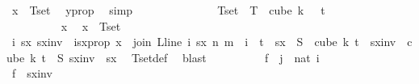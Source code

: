 \begin{isabellebody}
\ {\isachardoublequoteopen}x\ {\isasymin}\ Tset{\isachardoublequoteclose}\ \isamarkupfalse%
\ y{\isacharunderscore}{\kern0pt}prop\ \isamarkupfalse%
\ simp\isanewline
\ \ \ \ \ \ \isamarkupfalse%
\isanewline
\isanewline
\ \ \ \ \ \ \isamarkupfalse%
\ {\isachardoublequoteopen}Tset\ {\isasymsubseteq}\ T\ {\isacharbackquote}{\kern0pt}\ cube\ {\isacharparenleft}{\kern0pt}k\ {\isacharplus}{\kern0pt}\ {}{\isacharparenright}{\kern0pt}\ {\isacharparenleft}{\kern0pt}t\ {\isacharplus}{\kern0pt}\ {}{\isacharparenright}{\kern0pt}{\isachardoublequoteclose}\ \isanewline
\ \ \ \ \ \ \isamarkupfalse%
\isanewline
\ \ \ \ \ \ \ \ \isamarkupfalse%
\ x\ \isamarkupfalse%
\ {\isachardoublequoteopen}x\ {\isasymin}\ Tset{\isachardoublequoteclose}\isanewline
\ \ \ \ \ \ \ \ \isamarkupfalse%
\ \isamarkupfalse%
\ i\ sx\ sxinv\ \ isx{\isacharunderscore}{\kern0pt}prop{\isacharcolon}{\kern0pt}\ {\isachardoublequoteopen}x\ {\isacharequal}{\kern0pt}\ join\ {\isacharparenleft}{\kern0pt}L{\isacharunderscore}{\kern0pt}line\ i{\isacharparenright}{\kern0pt}\ sx\ n\ m\ {\isasymand}\ i\ {\isasymin}\ {\isacharbraceleft}{\kern0pt}{\isachardot}{\kern0pt}{\isachardot}{\kern0pt}{\isacharless}{\kern0pt}t{\isacharplus}{\kern0pt}{}{\isacharbraceright}{\kern0pt}\ {\isasymand}\ sx\ {\isasymin}\ S\ {\isacharbackquote}{\kern0pt}\ {\isacharparenleft}{\kern0pt}cube\ k\ {\isacharparenleft}{\kern0pt}t{\isacharplus}{\kern0pt}{}{\isacharparenright}{\kern0pt}{\isacharparenright}{\kern0pt}\ {\isasymand}\ sxinv\ {\isasymin}\ cube\ k\ {\isacharparenleft}{\kern0pt}t{\isacharplus}{\kern0pt}{}{\isacharparenright}{\kern0pt}\ {\isasymand}\ S\ sxinv\ {\isacharequal}{\kern0pt}\ sx{\isachardoublequoteclose}\ \isamarkupfalse%
\ Tset{\isacharunderscore}{\kern0pt}def\ \isamarkupfalse%
\ blast\isanewline
\ \ \ \ \ \ \ \ \isamarkupfalse%
\ {\isacharquery}{\kern0pt}f{}\ {\isacharequal}{\kern0pt}\ {\isachardoublequoteopen}{\isacharparenleft}{\kern0pt}{\isasymlambda}j\ {\isasymin}\ {\isacharbraceleft}{\kern0pt}{\isachardot}{\kern0pt}{\isachardot}{\kern0pt}{\isacharless}{\kern0pt}{}{\isacharcolon}{\kern0pt}{\isacharcolon}{\kern0pt}nat{\isacharbraceright}{\kern0pt}{\isachardot}{\kern0pt}\ i{\isacharparenright}{\kern0pt}{\isachardoublequoteclose}\isanewline
\ \ \ \ \ \ \ \ \isamarkupfalse%
\ {\isacharquery}{\kern0pt}f{}\ {\isacharequal}{\kern0pt}\ {\isachardoublequoteopen}sxinv{\isachardoublequoteclose}\isanewline

\end{isabellebody}
